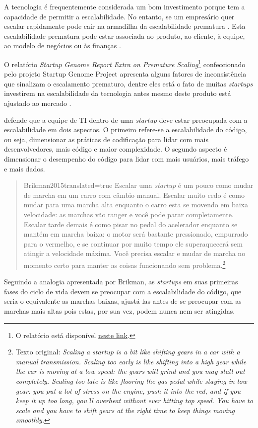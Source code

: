 A tecnologia é frequentemente considerada um bom investimento porque tem a capacidade
de permitir a escalabilidade. No entanto, se um empresário quer escalar rapidamente
pode cair na armadilha da escalabilidade prematura \cite{Kotsch2017}. Esta escalabilidade
prematura pode estar associada ao produto, ao cliente, à equipe, ao modelo de negócios
ou às finanças \cite{StartupGenome2011}.

O relatório \textit{Startup Genome Report Extra on Premature Scaling}\footnote{O relatório
está disponível \href{https://a4389177-39da-4622-a867-e7d6f48a3333.filesusr.com/ugd/fde30c_6b9eb284e987474899a746989086d8ee.pdf}
{neste link}.}
confeccionado pelo projeto Startup Genome Project apresenta alguns fatores de inconsistência
que sinalizam o escalamento prematuro, dentre eles está o fato de muitas \textit{startups}
investirem na escalabilidade da tecnologia antes mesmo deste produto está ajustado ao
mercado \cite{StartupGenome2011}.

 defende que a equipe de \gls{TI} dentro de uma \textit{startup}
deve estar preocupada com a escalabilidade em dois aspectos. O primeiro refere-se a
escalabilidade do código, ou seja, dimensionar as práticas de codificação para lidar
com mais desenvolvedores, mais código e maior complexidade. O segundo aspecto é dimensionar
o desempenho do código para lidar com mais usuários, mais tráfego e mais dados.

\begin{quotation}{Brikman2015}{translated=true}
    Escalar uma \textit{startup} é um pouco como mudar de marcha em um carro com câmbio manual.
    Escalar muito cedo é como mudar para uma marcha alta enquanto o carro esta se movendo
    em baixa velocidade: as marchas vão ranger e você pode parar completamente. Escalar
    tarde demais é como pisar no pedal do acelerador enquanto se mantém em marcha baixa:
    o motor será bastante pressionado, empurrado para o vermelho, e se continuar por muito
    tempo ele superaquecerá sem atingir a velocidade máxima. Você precisa escalar e mudar
    de marcha no momento certo para manter as coisas funcionando sem problema.\footnote{
    Texto original: \textit{Scaling a startup is a bit like shifting gears in a car with a
    manual transmission. Scaling too early is like shifting into a high gear while the car
    is moving at a low speed: the gears will grind and you may stall out completely. Scaling
    too late is like flooring the gas pedal while staying in low gear: you put a lot of stress
    on the engine, push it into the red, and if you keep it up too long, you'll overheat
    without ever hitting top speed. You have to scale and you have to shift gears at the right
    time to keep things moving smoothly.}}
\end{quotation}

Seguindo a analogia apresentada por Brikman, as \textit{startups} em suas primeiras fases
do ciclo de vida devem se preocupar com a escalabilidade do código, que seria o equivalente
as marchas baixas, ajustá-las antes de se preocupar com as marchas mais altas pois estas,
por sua vez, podem nunca nem ser atingidas.
